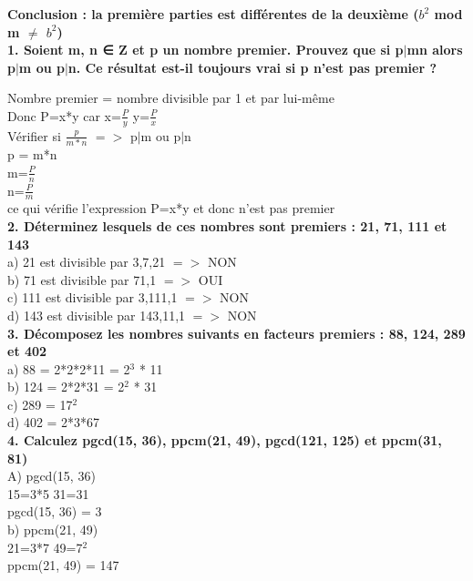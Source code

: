 \textbf{Conclusion : la première parties est différentes de la deuxième ($b^{2}$ mod m $\ne$ $b^{2}$) } \\

\newpage
\textbf{1. Soient m, n ∈ Z et p un nombre premier. Prouvez que si p$|$mn alors p$|$m ou p$|$n. Ce résultat est-il toujours vrai si p n’est pas premier ? }

Nombre premier = nombre divisible par 1 et par lui-même \\

Donc P=x*y car x=$\frac{P}{y}$ y=$\frac{P}{x}$ \\

Vérifier si $\frac{p}{m*n}$ $=>$  p$|$m ou p$|$n \\

p = m*n \\
m=$\frac{P}{n}$ \\
n=$\frac{P}{m}$ \\

ce qui vérifie l'expression P=x*y et donc n'est pas premier \\

\textbf{2. Déterminez lesquels de ces nombres sont premiers : 21, 71, 111 et 143} \\

a) 21 est divisible par 3,7,21 $=>$ NON \\
b) 71 est divisible par 71,1 $=>$ OUI  \\
c) 111 est divisible par 3,111,1 $=>$ NON  \\
d) 143 est divisible par 143,11,1 $=>$ NON \\

\textbf{3. Décomposez les nombres suivants en facteurs premiers : 88, 124, 289 et 402} \\

a) 88 = 2*2*2*11 = 2$^{3}$ * 11 \\
b) 124 = 2*2*31 = 2$^{2}$ * 31 \\
c) 289 = 17$^{2}$ \\
d) 402 = 2*3*67 \\

\textbf{4. Calculez pgcd(15, 36), ppcm(21, 49), pgcd(121, 125) et ppcm(31, 81)} \\

A) pgcd(15, 36)\\
15=3*5 31=31 \\
pgcd(15, 36) = 3 \\

b) ppcm(21, 49) \\
21=3*7  49=7$^{2}$ \\
ppcm(21, 49) = 147 \\

